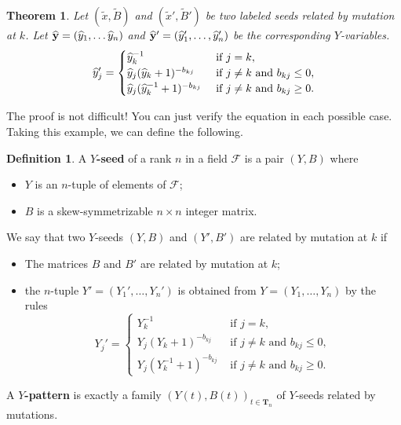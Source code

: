 \documentclass[]{pcmi}
\theoremstyle{plain}
\newtheorem{Theorem}[equation]{Theorem}
\theoremstyle{definition}
\newtheorem{Definition}[equation]{Definition}
\begin{document}
\begin{Theorem}
    Let $(\widetilde{x}, \widetilde{B})$ and $(\widetilde{x}', \widetilde{B}')$ be two labeled seeds related by mutation at $k$. Let $\widehat{\mathbf{y}} = (\widehat{y}_1, \ldots \widehat{y}_n)$ and $\widehat{\mathbf{y}}' = (\widehat{y}_1', \ldots, \widehat{y}_n')$ be the corresponding $Y$-variables.
    \begin{equation}
        \widehat{y}_j' =
        \begin{cases}
            \widehat{y}_k^{-1} & \text { if } j = k, \\
            \widehat{y}_j (\widehat{y}_k + 1)^{-b_{kj}} & \text{ if } j \neq k \text{ and } b_{kj} \leq 0, \\
            \widehat{y}_j (\widehat{y}_k^{-1} + 1)^{-b_{kj}} & \text{ if } j \neq k \text{ and } b_{kj} \geq 0.
        \end{cases}
    \end{equation}
\end{Theorem}

The proof is not difficult! You can just verify the equation in each possible case. Taking this example, we can define the following. 

\begin{Definition}
    A \textbf{$Y$-seed} of a rank $n$ in a field $\mathscr{F}$ is a pair $(Y, B)$ where 
    \begin{itemize}
        \item $Y$ is an $n$-tuple of elements of $\mathscr{F}$; 
        \item $B$ is a skew-symmetrizable $n \times n$ integer matrix. 
    \end{itemize}
    We say that two $Y$-seeds $(Y, B)$ and $(Y', B')$ are related by mutation at $k$ if 
    \begin{itemize}
        \item The matrices $B$ and $B'$ are related by mutation at $k$; 
        \item the $n$-tuple $Y' = (Y_1', \ldots, Y_n')$ is obtained from $Y = (Y_1, \ldots, Y_n)$ by the rules
        \begin{equation}
            Y_j' = \begin{cases}
                Y_k^{-1} & \text { if $j = k$,} \\
                Y_j(Y_k + 1)^{-b_{kj}} & \text{ if $j \neq k$ and $b_{kj} \leq 0$}, \\
                Y_j (Y_k^{-1} + 1)^{-b_{kj}} & \text{ if $j \neq k$ and $b_{kj} \geq 0$}. 
            \end{cases}
        \end{equation}
    \end{itemize}
    A \textbf{$Y$-pattern} is exactly a family $(Y(t), B(t))_{t \in \mathbf{T}_n}$ of $Y$-seeds related by mutations. 
\end{Definition}
\end{document}
